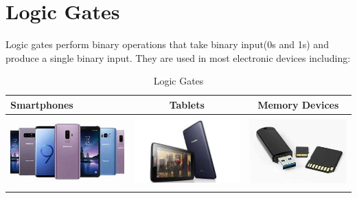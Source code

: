 \documentclass{article}
\begin{document}
	
	\section{Logic Gates}
	Logic gates perform binary operations that take binary input(0s and 1s) and produce a single binary input. They are used in most electronic devices including:
	
\begin{table}[h!]
	\begin{center}
		\caption{Logic Gates}
		\label{tab:table:1}
		\begin{tabular}{l|c|c}
			\hline
			Smartphones & Tablets & Memory Devices\\
			\hline
			\includegraphics[width=0.2\linewidth]{smartphones-for-table1} & \includegraphics[width=0.2\linewidth]{tablet-for-table1} & \includegraphics[width=0.6\linewidth]{memory-devices-for-table1}\\
				\hline
		\end{tabular}
	\end{center}
\end{table}
\end{document}

